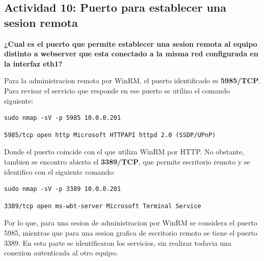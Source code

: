 \documentclass[letterpaper,11pt]{article}
\begin{document}
\subsection{Actividad 10: Puerto para establecer una sesion remota}

\textbf{¿Cual es el puerto que permite establecer una sesion
remota al equipo distinto a webserver que esta conectado a la
misma red configurada en la interfaz eth1?}

Para la administracion remota por WinRM, el puerto identificado es
\textbf{5985/TCP}. Para revisar el servicio que responde en ese
puerto se utilizo el comando siguiente:

\begin{lstlisting}[style=consolaSeguridad]
sudo nmap -sV -p 5985 10.0.0.201
\end{lstlisting}

\begin{lstlisting}[style=output]
5985/tcp open http Microsoft HTTPAPI httpd 2.0 (SSDP/UPnP)
\end{lstlisting}

Donde el puerto coincide con el que utiliza WinRM por HTTP. No
obstante, tambien se encontro abierto el \textbf{3389/TCP}, que
permite escritorio remoto y se identifico con el siguiente
comando:

\begin{lstlisting}[style=consolaSeguridad]
sudo nmap -sV -p 3389 10.0.0.201
\end{lstlisting}

\begin{lstlisting}[style=output]
3389/tcp open ms-wbt-server Microsoft Terminal Service
\end{lstlisting}

Por lo que, para una sesion de administracion por WinRM se
considera el puerto 5985, mientras que para una sesion grafica de
escritorio remoto se tiene el puerto 3389. En esta parte se
identificaron los servicios, sin realizar todavia una conexion
autenticada al otro equipo.


\newpage
\nocite{*}
\printbibliography[heading=bibintoc,title={Referencias}]
\end{document}
